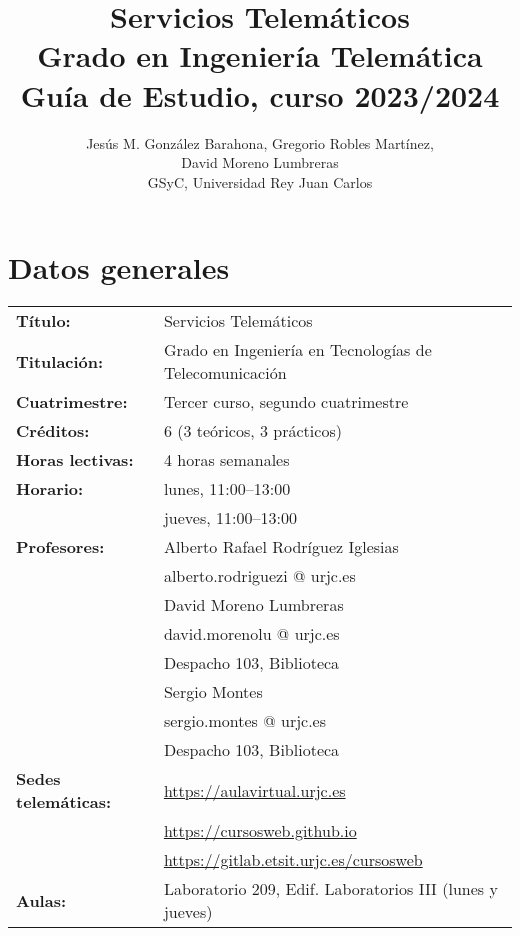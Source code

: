\documentclass[a4paper,12pt]{article}
\title{Servicios Telemáticos \\
Grado en Ingeniería Telemática \\
Guía de Estudio, curso 2023/2024}
\author{Jesús M. González Barahona, Gregorio Robles Martínez, \\
  David Moreno Lumbreras \\
GSyC, Universidad Rey Juan Carlos}
\begin{document}
\maketitle

\tableofcontents

\newpage

\section{Datos generales}

\begin{tabular}{ll}
\textbf{Título:} & Servicios Telemáticos \\
\textbf{Titulación:} & Grado en Ingeniería en Tecnologías de Telecomunicación \\
\textbf{Cuatrimestre:} & Tercer curso, segundo cuatrimestre \\
\textbf{Créditos:} & 6 (3 teóricos, 3 prácticos) \\
\textbf{Horas lectivas:} & 4 horas semanales \\
\textbf{Horario:} & lunes, 11:00--13:00 \\
                  & jueves, 11:00--13:00 \\
\textbf{Profesores:}
& Alberto Rafael Rodríguez Iglesias \\
& \hspace{1cm}alberto.rodriguezi @ urjc.es \\
& David Moreno Lumbreras \\
& \hspace{1cm}david.morenolu @ urjc.es \\
& \hspace{1cm}Despacho 103, Biblioteca\\
& Sergio Montes\\
& \hspace{1cm}sergio.montes @ urjc.es \\
& \hspace{1cm}Despacho 103, Biblioteca\\
\textbf{Sedes telemáticas:} & \url{https://aulavirtual.urjc.es} \\
                            & \url{https://cursosweb.github.io} \\
                            & \url{https://gitlab.etsit.urjc.es/cursosweb} \\
\textbf{Aulas:} & Laboratorio 209, Edif. Laboratorios III (lunes y jueves) \\
\end{tabular}
\end{document}
